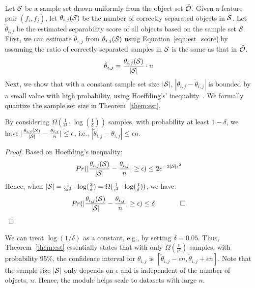 Let ${\mathcal{S}}$ be a sample set drawn uniformly from the object set $\hat{{\mathcal{O}}}$. Given a feature pair $(f_i,f_j)$, let $\theta_{i,j}({\mathcal{S}})$ be the number of correctly separated objects in ${\mathcal{S}}$. Let $\tilde{\theta}_{i,j}$ be the estimated separability score of all objects based on the sample set ${\mathcal{S}}$. First, we can estimate $\tilde{\theta}_{i,j}$ from $\theta_{i,j}({\mathcal{S}})$ using Equation~\ref{eqn:est_score} by assuming the ratio of correctly separated samples in ${\mathcal{S}}$ is the same as that in $\hat{{\mathcal{O}}}$.
\begin{equation}\label{eqn:est_score}
\tilde{\theta}_{i,j} = \frac{\theta_{i,j}({\mathcal{S}})}{|{\mathcal{S}}|} \cdot n
\end{equation}
\noindent Next, we show that with a constant sample set size $|{\mathcal{S}}|$, $|\theta_{i,j}-\tilde{\theta}_{i,j}|$ is bounded by a small value with high probability, using Hoeffding's' inequality~\cite{hoeffding1963probability}. We formally quantize the sample set size in Theorem~\ref{them:est}.

\begin{theorem}\label{them:est}
By considering $\Omega(\frac{1}{\epsilon^2}\cdot \log(\frac{1}{\delta}))$ samples, with probability at least $1-\delta$, we have $|\frac{\theta_{i,j}({\mathcal{S}})}{|{\mathcal{S}}|}-\frac{\theta_{i,j}}{n}| \leq \epsilon$, i.e., $|\tilde{\theta}_{i,j}-\theta_{i,j}|\leq \epsilon n$.
\end{theorem}

\begin{proof}
  Based on Hoeffding's inequality:
  $$Pr(|\frac{\theta_{i,j}({\mathcal{S}})}{|{\mathcal{S}}|}-\frac{\theta_{i,j}}{n}| \geq \epsilon) \leq 2e^{-2|{\mathcal{S}}|\epsilon^2}$$
  Hence, when $|{\mathcal{S}}| = \frac{1}{2\epsilon^2}\cdot \log(\frac{2}{\delta}) = \Omega(\frac{1}{\epsilon^2}\cdot \log(\frac{1}{\delta}))$, we have:
$$
  Pr(|\frac{\theta_{i,j}({\mathcal{S}})}{|{\mathcal{S}}|}-\frac{\theta_{i,j}}{n}| \geq \epsilon) \leq \delta \ \ \ \ \ \ \ \ \ \ \ \square
$$
\end{proof}
\noindent We can treat $\log(1/\delta)$ as a constant, e.g., by setting $\delta = 0.05$. Thus, Theorem~\ref{them:est} essentially states that with only $\Omega(\frac{1}{\epsilon^2})$ samples, with probability 95\%, the confidence interval for $\theta_{i,j}$ is $[\tilde{\theta}_{i,j}-\epsilon n, \tilde{\theta}_{i,j}+\epsilon n]$. Note that the sample size $|{\mathcal{S}}|$ only depends on $\epsilon$ and is independent of the number of objects, $n$. Hence, the \sampling module helps \genviz scale to datasets with large $n$.

